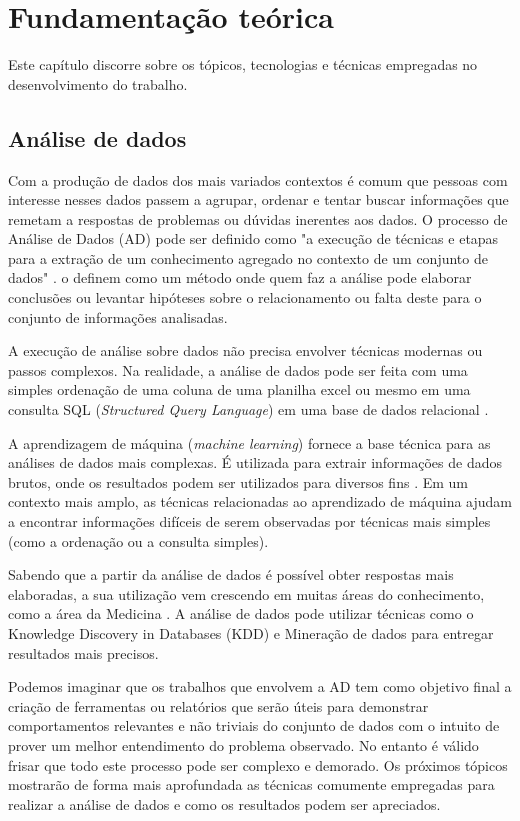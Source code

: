 \chapter{Fundamentação teórica}

Este capítulo discorre sobre os tópicos, tecnologias e técnicas empregadas no desenvolvimento do trabalho.

\section{Análise de dados}

Com a produção de dados dos mais variados contextos é comum que pessoas com interesse nesses dados passem a agrupar, ordenar e tentar buscar informações que remetam a respostas de problemas ou dúvidas inerentes aos dados. O processo de Análise de Dados (AD) pode ser definido como "a execução de técnicas e etapas para a extração de um conhecimento agregado no contexto de um conjunto de dados" \cite{AMARAL2016}.  o definem como um método onde quem faz a análise pode elaborar conclusões ou levantar hipóteses sobre o relacionamento ou falta deste para o conjunto de informações analisadas.

A execução de análise sobre dados não precisa envolver técnicas modernas ou passos complexos. Na realidade, a análise de dados pode ser feita com uma simples ordenação de uma coluna de uma planilha excel ou mesmo em uma consulta SQL (\textit{Structured Query Language}) em uma base de dados relacional \cite{AMARAL2016}. 

A aprendizagem de máquina (\emph{machine learning}) fornece a base técnica para as análises de dados mais complexas. É utilizada para extrair informações de dados brutos, onde os resultados podem ser utilizados para diversos fins \cite{Witten2016}. Em um contexto mais amplo, as técnicas relacionadas ao aprendizado de máquina ajudam a encontrar informações difíceis de serem observadas por técnicas mais simples (como a ordenação ou a consulta simples).

Sabendo que a partir da análise de dados é possível obter respostas mais elaboradas, a sua utilização vem crescendo em muitas áreas do conhecimento, como a área da Medicina \cite{Holzinger2014}. A análise de dados pode utilizar técnicas como o Knowledge Discovery in Databases (KDD) \cite{Holzinger2014} e Mineração de dados \cite{Aggarwal2015} para entregar resultados mais precisos.

Podemos imaginar que os trabalhos que envolvem a AD tem como objetivo final a criação de ferramentas ou relatórios que serão úteis para demonstrar comportamentos relevantes e não triviais do conjunto de dados com o intuito de prover um melhor entendimento do problema observado. No entanto é válido frisar que todo este processo pode ser complexo e demorado. Os próximos tópicos mostrarão de forma mais aprofundada as técnicas comumente empregadas para realizar a análise de dados e como os resultados podem ser apreciados.

